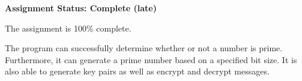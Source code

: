 \documentclass[11pt]{memo}
\begin{document}
\USM

\Date{\today}

\begin{memo}

\textbf{Assignment Status: Complete (late)}

The assignment is 100\% complete.

The program can successfully determine whether or not a number is prime.  Furthermore, it can generate a prime number based on a specified bit size.  It is also able to generate key pairs as well as encrypt and decrypt messages.

\end{memo}
\end{document}
